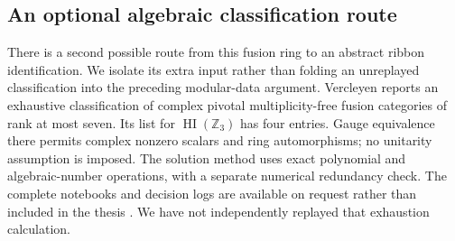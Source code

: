 \subsection{An optional algebraic classification route}

There is a second possible route from this fusion ring to an abstract
ribbon identification. We isolate its extra input rather than folding
an unreplayed classification into the preceding modular-data argument.
Vercleyen \cite[Section~4.4 and Table~9.1, p.~171]{Vercleyen} reports an
exhaustive classification of complex pivotal multiplicity-free fusion
categories of rank at most seven. Its list for $\operatorname{HI}(\mathbb
Z_3)$ has four entries. Gauge equivalence there permits complex nonzero
scalars and ring automorphisms; no unitarity assumption is imposed.
The solution method uses exact polynomial and algebraic-number
operations, with a separate numerical redundancy check. The complete
notebooks and decision logs are available on request rather than
included in the thesis \cite[Sections~4.1.7--4.1.8 and~4.4.1]{Vercleyen}.
We have not independently replayed that exhaustion calculation.

